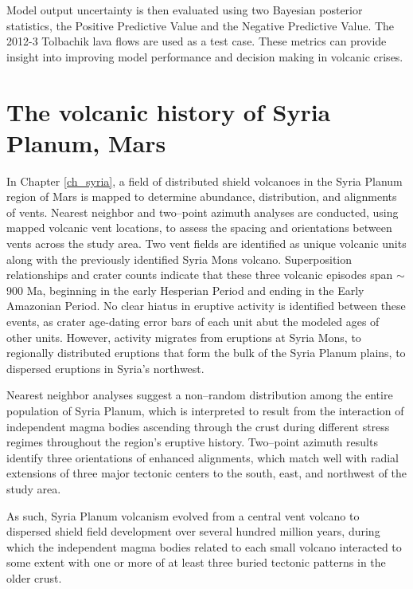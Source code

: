 Model output uncertainty is then evaluated using two Bayesian posterior statistics, the Positive Predictive Value and the Negative Predictive Value. The 2012-3 Tolbachik lava flows are used as a test case. These metrics can provide insight into improving model performance and decision making in volcanic crises.

\section{The volcanic history of Syria Planum, Mars}
In Chapter \ref{ch_syria}, a field of distributed shield volcanoes in the Syria Planum region of Mars is mapped to determine abundance, distribution, and alignments of vents. Nearest neighbor and two--point azimuth analyses are conducted, using mapped volcanic vent locations, to assess the spacing and orientations between vents across the study area. Two vent fields are identified as unique volcanic units along with the previously identified Syria Mons volcano. Superposition relationships and crater counts indicate that these three volcanic episodes span $\sim$900 Ma, beginning in the early Hesperian Period and ending in the Early Amazonian Period. No clear hiatus in eruptive activity is identified between these events, as crater age-dating error bars of each unit abut the modeled ages of other units. However, activity migrates from eruptions at Syria Mons, to regionally distributed eruptions that form the bulk of the Syria Planum plains, to dispersed eruptions in Syria's northwest. 

Nearest neighbor analyses suggest a non--random distribution among the entire population of Syria Planum, which is interpreted to result from the interaction of independent magma bodies ascending through the crust during different stress regimes throughout the region's eruptive history. Two--point azimuth results identify three orientations of enhanced alignments, which match well with radial extensions of three major tectonic centers to the south, east, and northwest of the study area. 

As such, Syria Planum volcanism evolved from a central vent volcano to dispersed shield field development over several hundred million years, during which the independent magma bodies related to each small volcano interacted to some extent with one or more of at least three buried tectonic patterns in the older crust.



